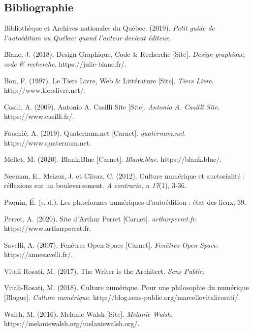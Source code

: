 \documentclass[12pt,french,letterpaper]{article}
\begin{document}
{\hypertarget{bibliographie}{%
\subsection*{Bibliographie}\label{bibliographie}}

\hypertarget{refs}{}
\leavevmode\hypertarget{ref-bibliotheque_et_archives_nationales_du_quebec_petit_2019}{}%
Bibliothèque et Archives nationales du Québec. (2019). \emph{Petit guide
de l'autoédition au Québec: quand l'auteur devient éditeur.}

\leavevmode\hypertarget{ref-blanc_design_2018}{}%
Blanc, J. (2018). Design Graphique, Code \& Recherche {[}Site{]}.
\emph{Design graphique, code \& recherche}. https://julie-blanc.fr/.

\leavevmode\hypertarget{ref-bon_tiers_1997}{}%
Bon, F. (1997). Le Tiers Livre, Web \& Littérature {[}Site{]}.
\emph{Tiers Livre}. http://www.tierslivre.net/.

\leavevmode\hypertarget{ref-casili_antonio_2009}{}%
Casili, A. (2009). Antonio A. Casilli Site {[}Site{]}. \emph{Antonio A.
Casilli Site}. https://www.casilli.fr/.

\leavevmode\hypertarget{ref-fauchie_quaternumnet_2019}{}%
Fauchié, A. (2019). Quaternum.net {[}Carnet{]}. \emph{quaternum.net}.
https://www.quaternum.net.

\leavevmode\hypertarget{ref-mellet_blankblue_2020}{}%
Mellet, M. (2020). Blank.Blue {[}Carnet{]}. \emph{Blank.blue}.
https://blank.blue/.

\leavevmode\hypertarget{ref-neeman_culture_2012}{}%
Neeman, E., Meizoz, J. et Clivaz, C. (2012). Culture numérique et
auctorialité : réflexions sur un bouleversement. \emph{A contrario},
\emph{n 17}(1), 3‑36.

\leavevmode\hypertarget{ref-paquin_les_nodate}{}%
Paquin, É. (s. d.). Les plateformes numériques d'autoédition : état des
lieux, 39.

\leavevmode\hypertarget{ref-perret_site_2020}{}%
Perret, A. (2020). Site d'Arthur Perret {[}Carnet{]}.
\emph{arthurperret.fr}. https://www.arthurperret.fr.

\leavevmode\hypertarget{ref-savelli_fenetres_2007}{}%
Savelli, A. (2007). Fenêtres Open Space {[}Carnet{]}. \emph{Fenêtres
Open Space}. https://annesavelli.fr/.

\leavevmode\hypertarget{ref-vitali_rosati_writer_2017}{}%
Vitali Rosati, M. (2017). The Writer is the Architect. \emph{Sens
Public}.

\leavevmode\hypertarget{ref-vitali-rosati_culture_2018}{}%
Vitali-Rosati, M. (2018). Culture numérique. Pour une philosophie du
numérique {[}Blogue{]}. \emph{Culture numérique.}
http://blog.sens-public.org/marcellovitalirosati/.

\leavevmode\hypertarget{ref-walsh_melanie_2016}{}%
Walsh, M. (2016). Melanie Walsh {[}Site{]}. \emph{Melanie Walsh}.
https://melaniewalsh.org/melaniewalsh.org/.}
\end{document}
